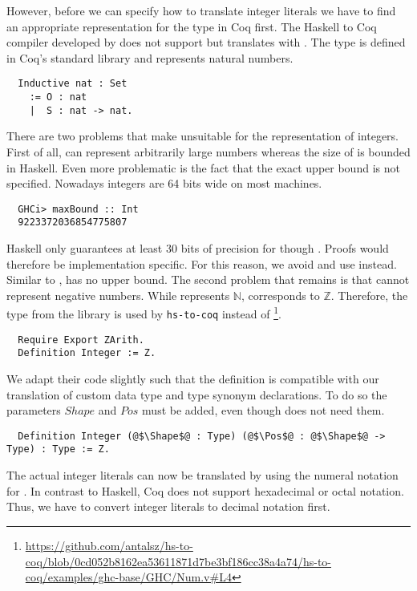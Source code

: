 However, before we can specify how to translate integer literals we have to find an appropriate representation for the type  in Coq first.
The Haskell to Coq compiler developed by \cite{Jessen:2019} does not support  but translates  with .
The type  is defined in Coq's standard library and represents natural numbers.
\begin{verbatim}
  Inductive nat : Set
    := O : nat
    |  S : nat -> nat.
\end{verbatim}
There are two problems that make  unsuitable for the representation of integers. First of all,  can represent arbitrarily large numbers whereas the size of  is bounded in Haskell.
Even more problematic is the fact that the exact upper bound is not specified.
Nowadays integers are 64 bits wide on most machines.
\begin{verbatim}
  GHCi> maxBound :: Int
  9223372036854775807
\end{verbatim}
Haskell only guarantees at least 30 bits of precision for  though \cite[p.~181]{Marlow:2010}.
Proofs would therefore be implementation specific.
For this reason, we avoid  and use  instead.
Similar to ,  has no upper bound.
The second problem that remains is that  cannot represent negative numbers.
While  represents $\mathbb{N}$,  corresponds to $\mathbb{Z}$.
Therefore, the type  from the  library is used by \texttt{hs-to-coq} instead of  \footnote{\url{https://github.com/antalsz/hs-to-coq/blob/0cd052b8162ea53611871d7be3bf186cc38a4a74/hs-to-coq/examples/ghc-base/GHC/Num.v\#L4}}.
\begin{verbatim}
  Require Export ZArith.
  Definition Integer := Z.
\end{verbatim}
We adapt their code slightly such that the definition is compatible with our translation of custom data type and type synonym declarations.
To do so the parameters $Shape$ and $Pos$ must be added, even though  does not need them.
\begin{verbatim}
  Definition Integer (@$\Shape$@ : Type) (@$\Pos$@ : @$\Shape$@ -> Type) : Type := Z.
\end{verbatim}
The actual integer literals can now be translated by using the numeral notation for .
In contrast to Haskell, Coq does not support hexadecimal or octal notation.
Thus, we have to convert integer literals to decimal notation first.
